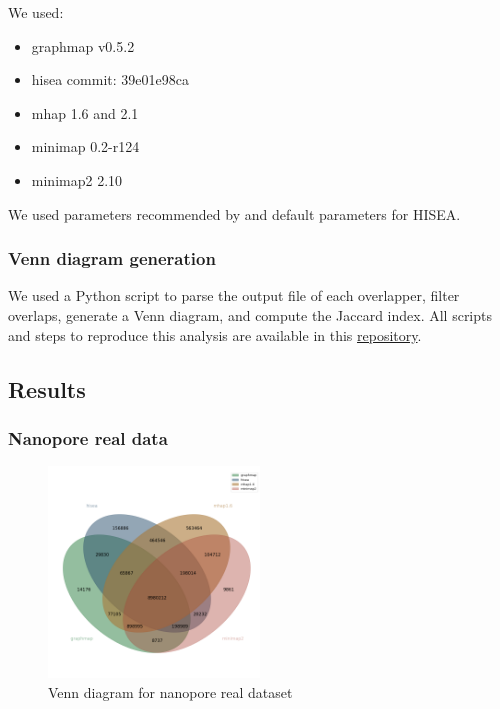 \documentclass[./main.tex]{subfiles}
\begin{document}
We used:

\begin{itemize}
\item graphmap v0.5.2 \cite{graphmap}
\item hisea commit: 39e01e98ca \cite{hisea}
\item mhap 1.6 and 2.1 \cite{Berlin2015}
\item minimap 0.2-r124 \cite{minimap}
\item minimap2 2.10 \cite{minimap2}
\end{itemize}

We used parameters recommended by \citeauthor{ovl_bench} and default parameters for HISEA.

\subsubsection{Venn diagram generation}\label{preassembly:ovl:venn-diagram-generation}

We used a Python script to parse the output file of each overlapper,
filter overlaps, generate a Venn diagram, and compute the Jaccard index.
All scripts and steps to reproduce this analysis are available in this
\href{https://github.com/natir/SOTA-long-read-overlapping-tools-comparative-analysis-data}{repository}.

\subsection{Results}\label{preassembly:ovl:results}

\subsubsection{Nanopore real data}\label{preassembly:ovl:nanopore-real-data}

\begin{figure}[ht]
\centering
\includegraphics[width=0.5\textwidth]{paper/blog_post/nanopore_venn.png}
\caption{Venn diagram for nanopore real dataset}
\end{figure}
\end{document}
